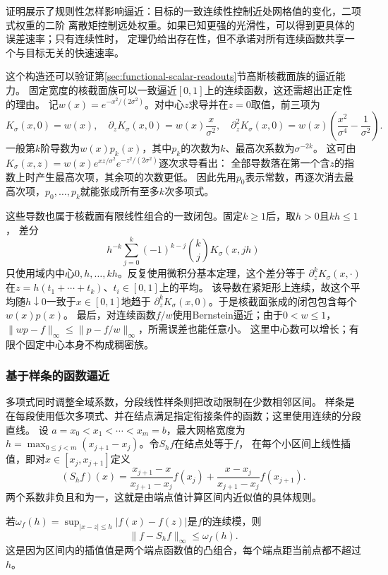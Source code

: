 证明展示了规则性怎样影响逼近：目标的一致连续性控制近处网格值的变化，二项式权重的二阶
离散矩控制远处权重。如果已知更强的光滑性，可以得到更具体的误差速率；只有连续性时，
定理仍给出存在性，但不承诺对所有连续函数共享一个与目标无关的快速速率。

这个构造还可以验证第\ref{sec:functional-scalar-readouts}节高斯核截面族的逼近能力。
固定宽度的核截面族可以一致逼近$[0,1]$上的连续函数，这还需超出正定性的理由。
记$w(x)=e^{-x^2/(2\sigma^2)}$。对中心$z$求导并在$z=0$取值，前三项为
\[
 K_\sigma(x,0)=w(x),\quad
 \partial_zK_\sigma(x,0)=w(x)\frac{x}{\sigma^2},\quad
 \partial_z^2K_\sigma(x,0)=w(x)\left(\frac{x^2}{\sigma^4}-\frac1{\sigma^2}\right).
\]
一般第$k$阶导数为$w(x)p_k(x)$，其中$p_k$的次数为$k$、最高次系数为$\sigma^{-2k}$。
这可由$K_\sigma(x,z)=w(x)e^{xz/\sigma^2}e^{-z^2/(2\sigma^2)}$逐次求导看出：
全部导数落在第一个含$z$的指数上时产生最高次项，其余项的次数更低。
因此先用$p_0$表示常数，再逐次消去最高次项，$p_0,\ldots,p_k$就能张成所有至多$k$次多项式。

这些导数也属于核截面有限线性组合的一致闭包。固定$k\geq1$后，取$h>0$且$kh\leq1$，
差分
\[
 h^{-k}\sum_{j=0}^k(-1)^{k-j}\binom kj K_\sigma(x,jh)
\]
只使用域内中心$0,h,\ldots,kh$。反复使用微积分基本定理，这个差分等于
$\partial_z^kK_\sigma(x,\cdot)$在$z=h(t_1+\cdots+t_k)$、$t_i\in[0,1]$上的平均。
该导数在紧矩形上连续，故这个平均随$h\downarrow0$一致于$x\in[0,1]$地趋于
$\partial_z^kK_\sigma(x,0)$。于是核截面张成的闭包包含每个$w(x)p(x)$。
最后，对连续函数$f/w$使用Bernstein逼近；由于$0<w\leq1$，
$\lVert wp-f\rVert_\infty\leq\lVert p-f/w\rVert_\infty$，所需误差也能任意小。
这里中心数可以增长；有限个固定中心本身不构成稠密族。

\subsubsection{基于样条的函数逼近}
\label{sec:functional-spline-approximation}

多项式同时调整全域系数，分段线性样条则把改动限制在少数相邻区间。
样条是在每段使用低次多项式、并在结点满足指定衔接条件的函数；这里使用连续的分段直线。
设
$a=x_0<x_1<\cdots<x_m=b$，最大网格宽度为
$h=\max_{0\leq j<m}(x_{j+1}-x_j)$。令$S_hf$在结点处等于$f$，
在每个小区间上线性插值，即对$x\in[x_j,x_{j+1}]$定义
\[
 (S_hf)(x)=
 \frac{x_{j+1}-x}{x_{j+1}-x_j}f(x_j)
 +\frac{x-x_j}{x_{j+1}-x_j}f(x_{j+1}).
\]
两个系数非负且和为一，这就是由端点值计算区间内近似值的具体规则。

若$\omega_f(h)=\sup_{|x-z|\leq h}|f(x)-f(z)|$是$f$的连续模，则
\[
  \lVert f-S_hf\rVert_\infty\leq\omega_f(h).
\]
这是因为区间内的插值值是两个端点函数值的凸组合，每个端点距当前点都不超过$h$。

